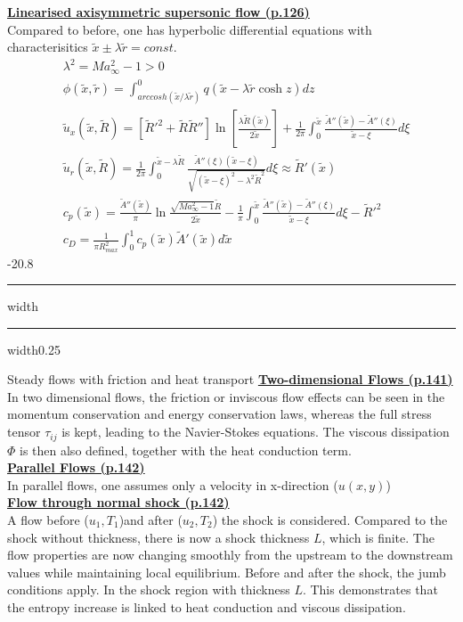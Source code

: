 \documentclass[8pt, landscape, fleqn]{scrartcl}
\makeatletter
\renewcommand{\section}{\@startsection{section}{1}{0mm}%
{-2\baselineskip}{0.8\baselineskip}%
{\hrule depth 0.2pt width\columnwidth\hrule depth1.5pt
width0.25\columnwidth\vspace*{1.2em}\Large\bfseries\rmfamily}}
\makeatother
\begin{document}
\begin{multicols*}{3}
\underline{\textbf{Linearised axisymmetric supersonic flow (p.126)}} \\
Compared to before, one has hyperbolic differential equations with characterisitics $\tilde{x}\pm \lambda \tilde{r} = const.$
\begin{align*}
    &\lambda^2 = Ma_\infty^2-1 > 0 \\
    &\phi(\tilde{x},\tilde{r}) = \int_{arccosh(\tilde{x}/\lambda\tilde{r})}^0 q (\tilde{x}-\lambda\tilde{r}\cosh z)dz \\
    &\tilde{u}_x(\tilde{x},\tilde{R}) = \left[ \tilde{R}'^2 + \tilde{R}\tilde{R}'' \right] \ln\left[ \frac{\lambda \tilde{R}(\tilde{x})}{2\tilde{x}}\right]+\frac{1}{2\pi}\int_0^{\tilde{x}} \frac{\tilde{A}''(\tilde{x})-\tilde{A}''(\xi)}{\tilde{x}-\xi} d\xi \\
    &\tilde{u}_r(\tilde{x},\tilde{R}) = \frac{1}{2\pi}\int_0^{\tilde{x}-\lambda\tilde{R}} \frac{\tilde{A}''(\xi)(\tilde{x}-\xi)}{\sqrt{(\tilde{x}-\xi)^2-\lambda^2\tilde{R}^2}} d\xi \approx \tilde{R}'(\tilde{x}) \\
    &c_p(\tilde{x}) =\frac{\tilde{A}''(\tilde{x})}{\pi}\ln \frac{\sqrt{Ma_\infty^2-1}\tilde{R}}{2\tilde{x}} - \frac{1}{\pi}\int_0^{\tilde{x}} \frac{\tilde{A}''(\tilde{x})-\tilde{A}''(\xi)}{\tilde{x}-\xi} d\xi - \tilde{R}'^2 \\
    &c_D = \frac{1}{\pi R_{max}^2} \int_0^1 c_p(\tilde{x})\tilde{A}'(\tilde{x})d\tilde{x}
\end{align*}
\setcounter{section}{12}
\section{Steady flows with friction and heat transport}
\underline{\textbf{Two-dimensional Flows (p.141)}} \\
In two dimensional flows, the friction or inviscous flow effects can be seen in the momentum conservation and energy conservation laws, whereas the full stress tensor $\tau_{ij}$ is kept, leading to the Navier-Stokes equations. The viscous dissipation $\Phi$ is then also defined, together with the heat conduction term. \\

\underline{\textbf{Parallel Flows (p.142)}}\\
In parallel flows, one assumes only a velocity in x-direction ($u(x,y)$) \\

\underline{\textbf{Flow through normal shock (p.142)}}\\
A flow before (${u_1,T_1}$)and after (${u_2,T_2}$) the shock is considered. Compared to the shock without thickness, there is now a shock thickness $L$, which is finite. The flow properties are now changing smoothly from the upstream to the downstream values while maintaining local equilibrium. Before and after the shock, the jumb conditions apply. In the shock region with thickness $L$. This demonstrates that the entropy increase is linked to heat conduction and viscous dissipation. \\


\end{multicols*}
\end{document}
